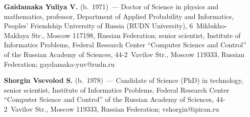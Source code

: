 \vspace*{3pt}

\noindent
\textbf{Gaidamaka Yuliya V.} (b.\ 1971)~--- Doctor of Science in physics and mathematics, 
professor, Department of Applied Probability and Informatics, Peoples' Friendship University of Russia 
(RUDN University), 6~Miklukho-Maklaya Str., Moscow 117198, Russian Federation; senior scientist, 
Institute of Informatics Problems, Federal Research Center ``Computer Science and Control'' of the 
Russian Academy of Sciences, 44-2~Vavilov Str., Moscow 119333, Russian Federation;  
\mbox{gaydamaka-yuv@rudn.ru}

\vspace*{3pt}

\noindent
\textbf{Shorgin Vsevolod S.} (b.\ 1978)~--- Candidate of Science (PhD) in technology, senior 
scientist, Institute of Informatics Problems, Federal Research Center ``Computer Science and 
Control'' of the Russian Academy of Sciences, 44-2~Vavilov Str., Moscow 119333, Russian 
Federation; \mbox{vshorgin@ipiran.ru}
\label{end\stat}

\renewcommand{\bibname}{\protect\rm Литература} 